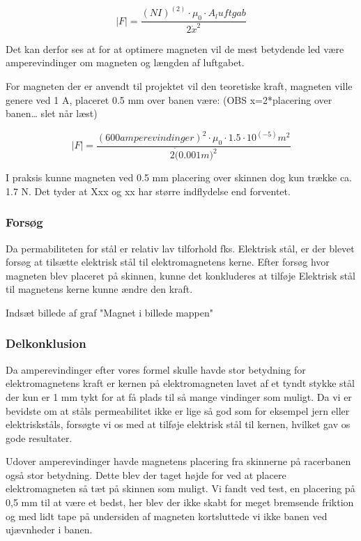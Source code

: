 \begin{equation}
\mid F \mid = \frac{(NI)^(2) \cdot \mu_0 \cdot A_luftgab } {2 \dot x^2}
\end{equation}

Det kan derfor ses at for at optimere magneten vil de mest betydende led være amperevindinger om magneten og længden af luftgabet.

For magneten der er anvendt til projektet vil den teoretiske kraft, magneten ville genere ved 1 A, placeret 0.5 mm over banen være: (OBS x=2*placering over banen… slet når læst)

\begin{equation}
\mid F \mid = \frac{(600 amperevindinger)^2 \cdot \mu_0 \cdot 1.5 \cdot 10^(-5) m^2 } {2 \dot (0.001m)^2}
\end{equation}

I praksis kunne magneten ved 0.5 mm placering over skinnen dog kun trække ca. 1.7 N. Det tyder at Xxx og xx har større indflydelse end forventet.

\subsubsection{Forsøg}
Da permabiliteten for stål er relativ lav tilforhold fks. Elektrisk stål, er der blevet forsøg at tilsætte elektrisk stål til elektromagnetens kerne. Efter forsøg hvor magneten blev placeret på skinnen, kunne det konkluderes at tilføje Elektrisk stål til magnetens kerne kunne ændre den kraft.

Indsæt billede af graf "Magnet i billede mappen"

\subsubsection{Delkonklusion}
Da amperevindinger efter vores formel skulle havde stor betydning for elektromagnetens kraft er kernen på elektromagneten lavet af et tyndt stykke stål der kun er 1 mm tykt for at få plads til så mange vindinger som muligt.  Da vi er bevidste om at ståls permeabilitet ikke er lige så god som for eksempel jern eller elektriskståls, forsøgte vi os med at tilføje elektrisk stål til kernen, hvilket gav os gode resultater.

Udover amperevindinger havde magnetens placering fra skinnerne på racerbanen også stor betydning. Dette blev der taget højde for ved at placere elektromagneten så tæt på skinnen som muligt. Vi fandt ved test, en placering på 0,5 mm til at være et bedst, her blev der ikke skabt for meget bremsende friktion og med lidt tape på undersiden af magneten kortsluttede vi ikke banen ved ujævnheder i banen.
